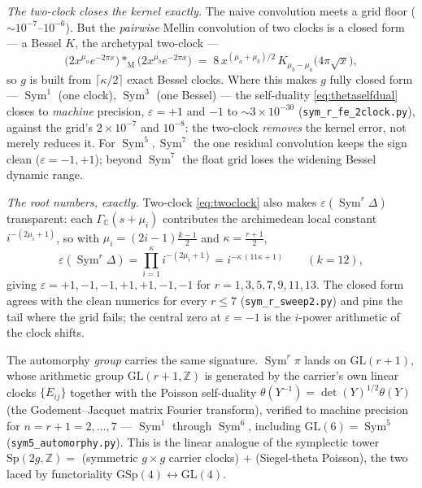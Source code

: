 \documentclass[11pt]{article}
\theoremstyle{definition}
\newcommand{\Sym}{\operatorname{Sym}}
\begin{document}
\emph{The two-clock closes the kernel exactly.} The naive convolution meets a grid floor
($\sim10^{-7}$--$10^{-6}$). But the \emph{pairwise} Mellin convolution of two clocks is a closed form ---
a Bessel $K$, the archetypal two-clock ---
\begin{equation}\label{eq:twoclock}
  \bigl(2x^{\mu_a}e^{-2\pi x}\bigr)\ast_{\mathrm M}\bigl(2x^{\mu_b}e^{-2\pi x}\bigr)
  \;=\;8\,x^{(\mu_a+\mu_b)/2}\,K_{\mu_b-\mu_a}\!\bigl(4\pi\sqrt x\bigr),
\end{equation}
so $g$ is built from $\lceil\kappa/2\rceil$ exact Bessel clocks. Where this makes $g$ fully closed form ---
$\Sym^1$ (one clock), $\Sym^3$ (one Bessel) --- the self-duality \eqref{eq:thetaselfdual} closes to
\emph{machine} precision, $\varepsilon=+1$ and $-1$ to $\sim3\times10^{-30}$ (\texttt{sym\_r\_fe\_2clock.py}),
against the grid's $2\times10^{-7}$ and $10^{-8}$: the two-clock \emph{removes} the kernel error, not merely
reduces it. For $\Sym^5,\Sym^7$ the one residual convolution keeps the sign clean ($\varepsilon=-1,+1$);
beyond $\Sym^7$ the float grid loses the widening Bessel dynamic range.

\emph{The root numbers, exactly.} Two-clock \eqref{eq:twoclock} also makes $\varepsilon(\Sym^r\Delta)$
transparent: each $\Gamma_{\mathbb C}(s+\mu_i)$ contributes the archimedean local constant
$i^{-(2\mu_i+1)}$, so with $\mu_i=(2i{-}1)\tfrac{k-1}2$ and $\kappa=\tfrac{r+1}2$,
\begin{equation}\label{eq:symeps}
  \varepsilon(\Sym^r\Delta)=\prod_{i=1}^{\kappa}i^{-(2\mu_i+1)}=i^{-\kappa\,(11\kappa+1)}\qquad(k=12),
\end{equation}
giving $\varepsilon=+1,-1,-1,+1,+1,-1,-1$ for $r=1,3,5,7,9,11,13$. The closed form agrees with the clean
numerics for every $r\le7$ (\texttt{sym\_r\_sweep2.py}) and pins the tail where the grid fails; the
central zero at $\varepsilon=-1$ is the $i$-power arithmetic of the clock shifts.

The automorphy \emph{group} carries the same signature. $\Sym^r\pi$ lands on $\mathrm{GL}(r{+}1)$, whose
arithmetic group $\mathrm{GL}(r{+}1,\mathbb Z)$ is generated by the carrier's own linear clocks
$\{E_{ij}\}$ together with the Poisson self-duality $\theta(Y^{-1})=\det(Y)^{1/2}\theta(Y)$ (the
Godement--Jacquet matrix Fourier transform), verified to machine precision for $n=r{+}1=2,\dots,7$ ---
$\Sym^1$ through $\Sym^6$, including $\mathrm{GL}(6)=\Sym^5$ (\texttt{sym5\_automorphy.py}). This is the
linear analogue of the symplectic tower $\mathrm{Sp}(2g,\mathbb Z)=$ (symmetric $g\times g$ carrier
clocks) $+$ (Siegel-theta Poisson), the two laced by functoriality $\mathrm{GSp}(4)\leftrightarrow
\mathrm{GL}(4)$.
\end{document}
